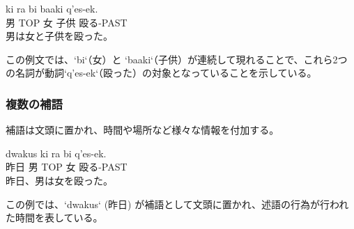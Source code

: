 \begin{exe}
    \ex \gll ki ra bi baaki q'es-ek.\\
    男 TOP 女 子供 殴る-PAST\\
    \glt 男は女と子供を殴った。
\end{exe}
この例文では、`bi`（女）と `baaki`（子供）が連続して現れることで、これら2つの名詞が動詞`q'es-ek`（殴った）の対象となっていることを示している。

\subsubsection{複数の補語}
補語は文頭に置かれ、時間や場所など様々な情報を付加する。

\begin{exe}
    \ex \gll dwakus ki ra bi q'es-ek.\\
    昨日 男 TOP 女 殴る-PAST\\
    \glt 昨日、男は女を殴った。
\end{exe}
この例では、`dwakus` (昨日) が補語として文頭に置かれ、述語の行為が行われた時間を表している。